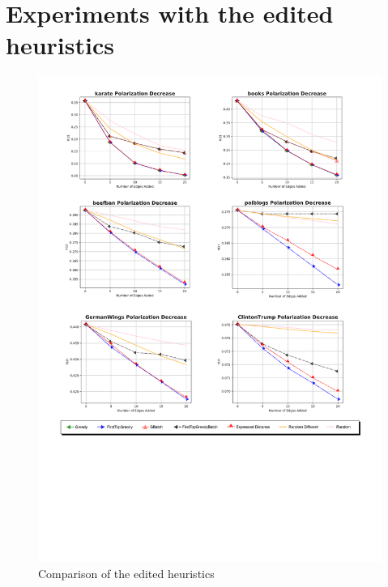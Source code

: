 \clearpage


\section{Experiments with the edited heuristics}		
\label{sec:experimentsProbs}

\begin{figure}[!htbp]
	\begin{center}
	\advance\leftskip-1.3cm
	\captionsetup{justification=centering,margin=2cm}
	\includegraphics[width=1.2\textwidth]{Figures/probs}
	\caption{Comparison of the edited heuristics}
	\end{center}
	\label{probs_heur}
\end{figure}

\clearpage








